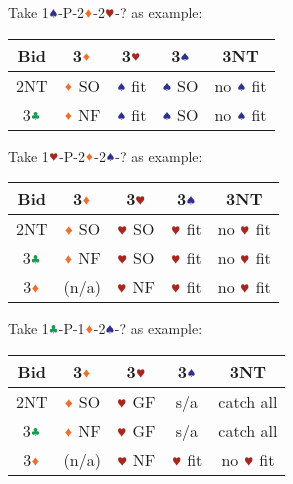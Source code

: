 \documentclass{article}
\newcommand*{\ccc}{\textcolor{ForestGreen}{\clubsuit}}
\newcommand*{\ddd}{\textcolor{Orange}{\vardiamondsuit}}
\newcommand*{\hhh}{\textcolor{Mahogany}{\varheartsuit}}
\newcommand*{\sss}{\textcolor{Blue}{\spadesuit}}
\begin{document}
\begin{multicols}{2}
\noindent Take 1$\sss$-P-2$\ddd$-2$\hhh$-? as example: \\
\begin{tabular}{c|c|c|c|c}
    \hline
    Bid & 3$\ddd$ & 3$\hhh$ & 3$\sss$ & 3NT \\ \hline\hline
    2NT & $\ddd$ SO & $\sss$ fit & $\sss$ SO & no $\sss$ fit \\ \hline
    3$\ccc$ & $\ddd$ NF & $\sss$ fit & $\sss$ SO & no $\sss$ fit \\ \hline
\end{tabular}

\noindent Take 1$\hhh$-P-2$\ddd$-2$\sss$-? as example: \\
\begin{tabular}{c|c|c|c|c}
    \hline
    Bid & 3$\ddd$ & 3$\hhh$ & 3$\sss$ & 3NT \\ \hline\hline
    2NT & $\ddd$ SO & $\hhh$ SO & $\hhh$ fit & no $\hhh$ fit \\ \hline
    3$\ccc$ & $\ddd$ NF & $\hhh$ SO & $\hhh$ fit & no $\hhh$ fit \\ \hline
    3$\ddd$ & (n/a) & $\hhh$ NF & $\hhh$ fit & no $\hhh$ fit \\ \hline
\end{tabular}

\noindent Take 1$\ccc$-P-1$\ddd$-2$\sss$-? as example: \\
\begin{tabular}{c|c|c|c|c}
    \hline
    Bid & 3$\ddd$ & 3$\hhh$ & 3$\sss$ & 3NT \\ \hline\hline
    2NT & $\ddd$ SO & $\hhh$ GF & s/a & catch all \\ \hline
    3$\ccc$ & $\ddd$ NF & $\hhh$ GF & s/a & catch all \\ \hline
    3$\ddd$ & (n/a) & $\hhh$ NF & $\hhh$ fit & no $\hhh$ fit \\ \hline
\end{tabular}


\end{multicols}
\end{document}
